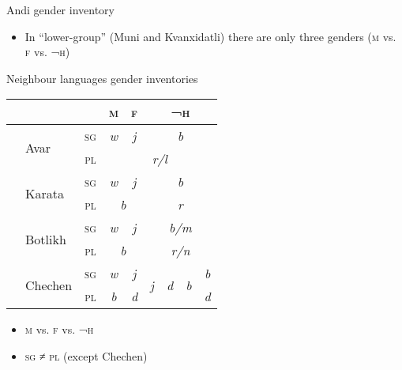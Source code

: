 \documentclass[13pt, t]{beamer}
\begin{document}
\begin{frame}{Andi gender inventory}
\begin{itemize}
\item In ``lower-group'' (Muni and Kvanxidatli) there are only three genders  (\textsc{m} vs. \textsc{f} vs. \textsc{¬h})
 


\end{itemize}
\end{frame}



\begin{frame}{Neighbour languages gender inventories}
\begin{tabular}{|l|l|c|c|c|c|c|c|c|}
\hline
\multicolumn{ 3}{|l|}{}& \textsc{m} & \textsc{f} & \multicolumn{ 4}{c|}{\textsc{¬h}} \\ \hline
\multirow{ 2}{*}{\citep{alekseev97}} & \multirow{ 2}{*}{Avar} & \textsc{sg} & \textit{w} & \textit{j} & \multicolumn{ 4}{c|}{\textit{b}} \\ \cline{ 3- 9}
\multicolumn{ 1}{|l|}{} & \multicolumn{ 1}{l|}{} & \textsc{pl} & \multicolumn{ 6}{c|}{\textit{r/l}} \\ \hline
\multirow{ 2}{*}{\citep{magomedbekova71}} & \multirow{ 2}{*}{Karata} & \textsc{sg} & \textit{w} & \textit{j} & \multicolumn{ 4}{c|}{\textit{b}} \\ \cline{ 3- 9}
\multicolumn{ 1}{|l|}{} & \multicolumn{ 1}{l|}{} & \textsc{pl} & \multicolumn{ 2}{c|}{\textit{b}} & \multicolumn{ 4}{c|}{\textit{r}} \\ \hline
\multirow{ 2}{*}{\citep{gudava62}} & \multirow{ 2}{*}{Botlikh} & \textsc{sg} & \textit{w} & \textit{j} & \multicolumn{ 4}{c|}{\textit{b/m}} \\ \cline{ 3- 9}
\multicolumn{ 1}{|l|}{} & \multicolumn{ 1}{l|}{} & \textsc{pl} & \multicolumn{ 2}{c|}{\textit{b}} & \multicolumn{ 4}{c|}{\textit{r/n}} \\ \hline
\multirow{ 2}{*}{\citep{nichols94}} & \multirow{ 2}{*}{Chechen} & \textsc{sg} & \textit{w} & \textit{j} & \multirow{ 2}{*}{\textit{j}} & \multirow{ 2}{*}{\textit{d}} & \multirow{ 2}{*}{\textit{b}} & \textit{b} \\ \cline{ 3- 5} \cline{ 9- 9}
\multicolumn{ 1}{|l|}{} & \multicolumn{ 1}{l|}{} & \textsc{pl} & \textit{b} & \textit{d} &  & & & \textit{d} \\ \hline
\end{tabular}
\vfill
\begin{itemize}
\item \textsc{m} vs. \textsc{f} vs. \textsc{¬h}
\item \textsc{sg} ≠ \textsc{pl} (except Chechen)
\end{itemize}
\end{frame}
\end{document}
